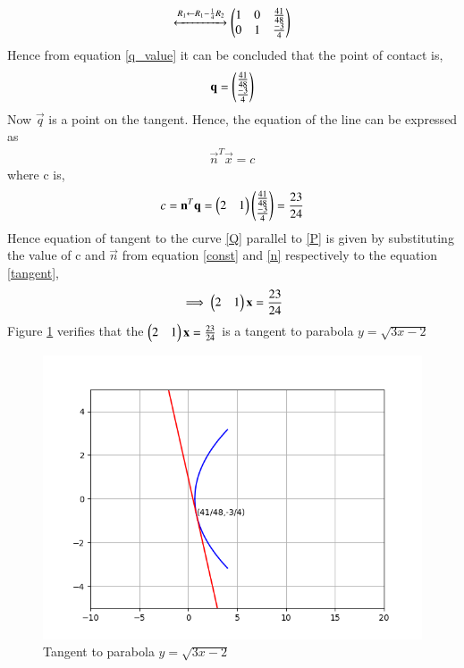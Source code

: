 \documentclass[journal,12pt,twocolumn]{IEEEtran}
\begin{document}
\begin{align}
\xleftrightarrow[]{R_1\leftarrow R_1-\frac{1}{4}R_2} \begin{pmatrix}1&0&\frac{41}{48}\\0&1&\frac{-3}{4}\end{pmatrix}
\label{q_value}
\end{align}
Hence from equation \eqref{q_value} it can be concluded that the point of contact is,
\begin{align}
\mathbf{q} = \begin{pmatrix}\frac{41}{48}\\\frac{-3}{4}\end{pmatrix}
\end{align}
Now $\vec{q}$ is a point on the tangent. Hence, the equation of the
line can be expressed as
\begin{align}
\vec{n}^T\vec{x} = c
\label{tangent}
\end{align}
where c is,
\begin{align}
 c = \mathbf{n}^T\mathbf{q} = \begin{pmatrix}2&1\end{pmatrix}\begin{pmatrix}\frac{41}{48}\\\frac{-3}{4}\end{pmatrix} = \frac{23}{24} 
 \label{const}
\end{align}
Hence equation of tangent to the curve \eqref{Q} parallel to \eqref{P} is given by substituting the value of c and $\vec{n}$ from equation \eqref{const} and \eqref{n} respectively to the equation \eqref{tangent},
\begin{align}
\implies\begin{pmatrix}2&1\end{pmatrix}\mathbf{x} = \frac{23}{24} 
\end{align}
Figure \ref{Figure_1} verifies that the $\begin{pmatrix}2&1\end{pmatrix}\mathbf{x} = \frac{23}{24}$ is a tangent to parabola  $y=\sqrt{3x-2}$
\begin{figure}[ht!]
\centering
\includegraphics[width=\columnwidth]{Figure_1.png}
\caption{Tangent to parabola $y=\sqrt{3x-2}$}
\label{Figure_1}
\end{figure}
\end{document}
